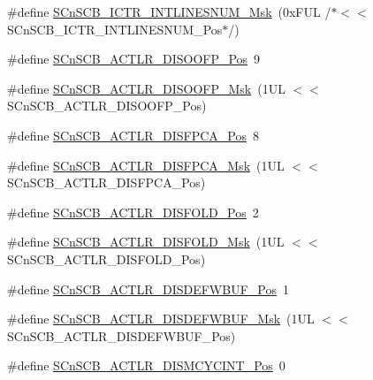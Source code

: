 \begin{DoxyCompactItemize}
\item 
\#define \hyperlink{group___c_m_s_i_s___s_cn_s_c_b_ga3efa0f5210051464e1034b19fc7b33c7}{S\+Cn\+S\+C\+B\+\_\+\+I\+C\+T\+R\+\_\+\+I\+N\+T\+L\+I\+N\+E\+S\+N\+U\+M\+\_\+\+Msk}~(0x\+F\+U\+L /$\ast$$<$$<$ S\+Cn\+S\+C\+B\+\_\+\+I\+C\+T\+R\+\_\+\+I\+N\+T\+L\+I\+N\+E\+S\+N\+U\+M\+\_\+\+Pos$\ast$/)
\item 
\#define \hyperlink{group___c_m_s_i_s___s_cn_s_c_b_gaff0b57464c60fea8182b903676f8de49}{S\+Cn\+S\+C\+B\+\_\+\+A\+C\+T\+L\+R\+\_\+\+D\+I\+S\+O\+O\+F\+P\+\_\+\+Pos}~9
\item 
\#define \hyperlink{group___c_m_s_i_s___s_cn_s_c_b_ga1ecd6adafa43464d7097b132c19e8640}{S\+Cn\+S\+C\+B\+\_\+\+A\+C\+T\+L\+R\+\_\+\+D\+I\+S\+O\+O\+F\+P\+\_\+\+Msk}~(1\+U\+L $<$$<$ S\+Cn\+S\+C\+B\+\_\+\+A\+C\+T\+L\+R\+\_\+\+D\+I\+S\+O\+O\+F\+P\+\_\+\+Pos)
\item 
\#define \hyperlink{group___c_m_s_i_s___s_cn_s_c_b_gaa194809383bc72ecf3416d85709281d7}{S\+Cn\+S\+C\+B\+\_\+\+A\+C\+T\+L\+R\+\_\+\+D\+I\+S\+F\+P\+C\+A\+\_\+\+Pos}~8
\item 
\#define \hyperlink{group___c_m_s_i_s___s_cn_s_c_b_ga10d5aa4a196dcde6f476016ece2c1b69}{S\+Cn\+S\+C\+B\+\_\+\+A\+C\+T\+L\+R\+\_\+\+D\+I\+S\+F\+P\+C\+A\+\_\+\+Msk}~(1\+U\+L $<$$<$ S\+Cn\+S\+C\+B\+\_\+\+A\+C\+T\+L\+R\+\_\+\+D\+I\+S\+F\+P\+C\+A\+\_\+\+Pos)
\item 
\#define \hyperlink{group___c_m_s_i_s___s_cn_s_c_b_gaab395870643a0bee78906bb15ca5bd02}{S\+Cn\+S\+C\+B\+\_\+\+A\+C\+T\+L\+R\+\_\+\+D\+I\+S\+F\+O\+L\+D\+\_\+\+Pos}~2
\item 
\#define \hyperlink{group___c_m_s_i_s___s_cn_s_c_b_gaa9dd2d4a2350499188f438d0aa9fd982}{S\+Cn\+S\+C\+B\+\_\+\+A\+C\+T\+L\+R\+\_\+\+D\+I\+S\+F\+O\+L\+D\+\_\+\+Msk}~(1\+U\+L $<$$<$ S\+Cn\+S\+C\+B\+\_\+\+A\+C\+T\+L\+R\+\_\+\+D\+I\+S\+F\+O\+L\+D\+\_\+\+Pos)
\item 
\#define \hyperlink{group___c_m_s_i_s___s_cn_s_c_b_gafa2eb37493c0f8dae77cde81ecf80f77}{S\+Cn\+S\+C\+B\+\_\+\+A\+C\+T\+L\+R\+\_\+\+D\+I\+S\+D\+E\+F\+W\+B\+U\+F\+\_\+\+Pos}~1
\item 
\#define \hyperlink{group___c_m_s_i_s___s_cn_s_c_b_ga6cda7b7219232a008ec52cc8e89d5d08}{S\+Cn\+S\+C\+B\+\_\+\+A\+C\+T\+L\+R\+\_\+\+D\+I\+S\+D\+E\+F\+W\+B\+U\+F\+\_\+\+Msk}~(1\+U\+L $<$$<$ S\+Cn\+S\+C\+B\+\_\+\+A\+C\+T\+L\+R\+\_\+\+D\+I\+S\+D\+E\+F\+W\+B\+U\+F\+\_\+\+Pos)
\item 
\#define \hyperlink{group___c_m_s_i_s___s_cn_s_c_b_gaaa3e79f5ead4a32c0ea742b2a9ffc0cd}{S\+Cn\+S\+C\+B\+\_\+\+A\+C\+T\+L\+R\+\_\+\+D\+I\+S\+M\+C\+Y\+C\+I\+N\+T\+\_\+\+Pos}~0

\end{DoxyCompactItemize}
